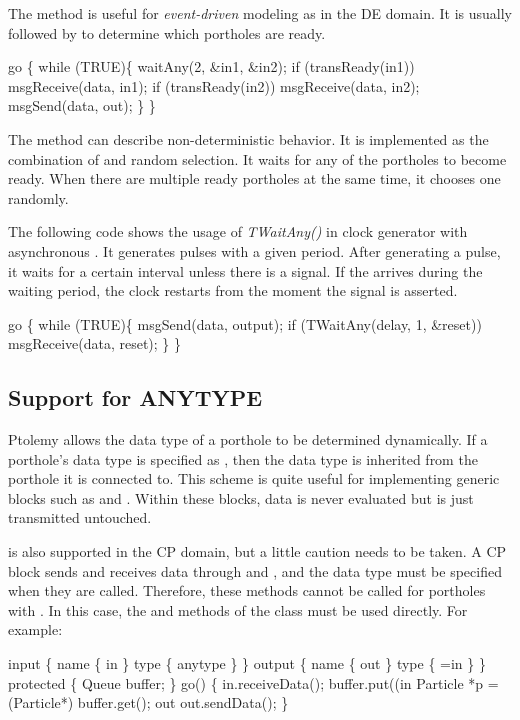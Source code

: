 The  method is useful for \emph{event-driven} modeling as in the
DE domain.  It is usually followed by  to
determine which portholes are ready.

\begin{example}
go \{
    while (TRUE)\{
        waitAny(2, &in1, &in2);
        if (transReady(in1)) msgReceive(data, in1);
        if (transReady(in2)) msgReceive(data, in2);
        msgSend(data, out);
    \}
\}
\end{example}

The  method can describe non-deterministic behavior.  It
is implemented as the combination of  and random
selection.  It waits for any of the portholes to become ready.  When
there are multiple ready portholes at the same time, it chooses one
randomly.

The following code shows the usage of \emph{TWaitAny()} in clock generator with 
asynchronous .  It generates pulses with a given period.  After
generating a pulse, it waits for a certain interval unless there is a
 signal.  If the  arrives during the waiting period,
the clock restarts from the moment the  signal is asserted.  

\begin{example}
go \{
    while (TRUE)\{
        msgSend(data, output);
        if (TWaitAny(delay, 1, &reset)) msgReceive(data, reset);
    \}
\}
\end{example}

\subsection{Support for ANYTYPE}

Ptolemy allows the data type of a porthole to be determined
dynamically.  If a porthole's data type is specified as
, then the data type is inherited from the porthole it is
connected to.  This scheme is quite useful for implementing generic
blocks such as   and .  Within these
blocks, data is never evaluated but is just transmitted untouched.

 is also supported in the CP domain, but a little caution
needs to be taken.  A CP block sends and receives data through
 and , and the data type must be
specified when they are called.  Therefore, these methods cannot be called for
portholes with .  In this case, the  and
 methods of the  class must be
used directly.  For example:

\begin{example}
input \{
    name \{ in \}
    type \{ anytype \}
\}
output \{
    name \{ out \}
    type \{ =in \}
\}
protected \{
    Queue buffer;
\}
go() \{
    in.receiveData();
    buffer.put((in%
    Particle *p = (Particle*) buffer.get();
    out%
    out.sendData();
\}
\end{example}
